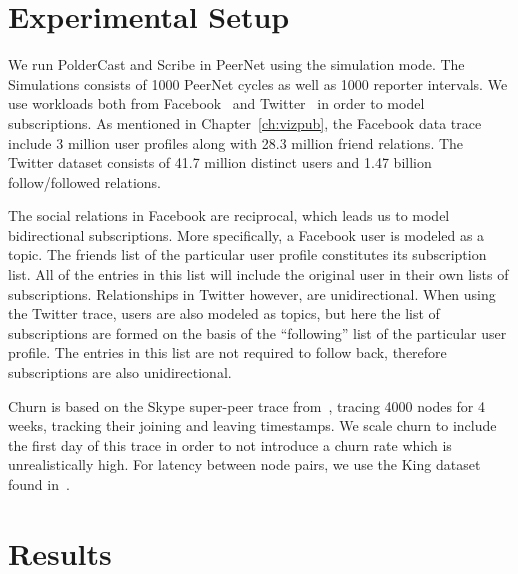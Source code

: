 \section{Experimental Setup}

We run PolderCast and Scribe in PeerNet using the simulation mode. The
Simulations consists of 1000 PeerNet cycles as well as 1000 reporter
intervals. We use workloads both from Facebook~\cite{facebook-eurosys09} and
Twitter~\cite{Kwak10www} in order to model subscriptions. As mentioned in
Chapter~\ref{ch:vizpub}, the Facebook data trace include 3 million user
profiles along with 28.3 million friend relations. The Twitter dataset
consists of 41.7 million distinct users and 1.47 billion
follow/followed relations.

The social relations in Facebook are reciprocal, which leads us to model
bidirectional subscriptions. More specifically, a Facebook user is
modeled as a topic. The friends list of the particular user profile
constitutes its subscription list. All of the entries in this list will
include the original user in their own lists of subscriptions.
Relationships in Twitter however, are unidirectional. When using the
Twitter trace, users are also modeled as topics, but here the list of
subscriptions are formed on the basis of the ``following'' list of the
particular  user profile. The entries in this list are not required to
follow back, therefore subscriptions are also unidirectional.

Churn is based on the Skype super-peer trace from~\cite{Guha:2006}, tracing 4000
nodes for 4 weeks, tracking their joining and leaving timestamps. We
scale churn to include the first day of this trace in order to not
introduce a churn rate which is unrealistically high. For latency
between node pairs, we use the King dataset found in~\cite{king}.

\section{Results}



